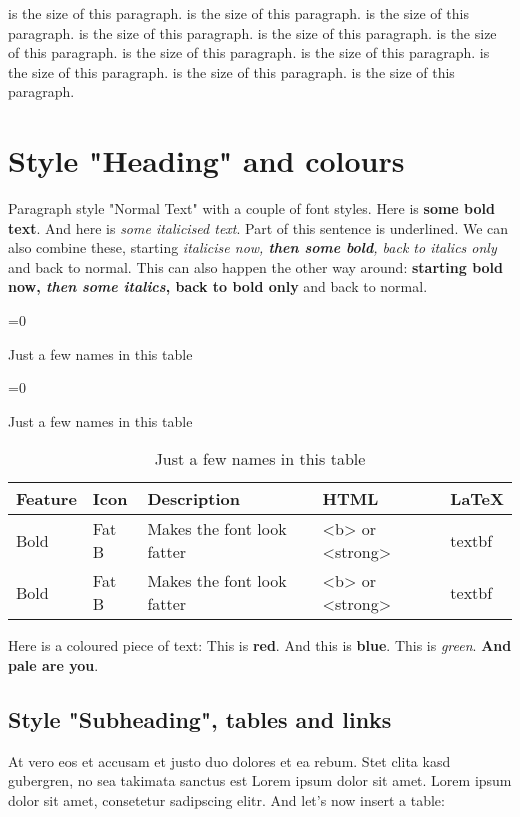 {\FontSizeTenPT 10pt is the size of this paragraph.}
{\FontSizeTwelvePT 12pt is the size of this paragraph.}
{\FontSizeFourteenPT 14pt is the size of this paragraph.}
{\FontSizeSixteenPT 16pt is the size of this paragraph.}
{\FontSizeEighteenPT 18pt is the size of this paragraph.}
{\FontSizeTwentyPT 20pt is the size of this paragraph.}
{\FontSizeTwentytwoPT 22pt is the size of this paragraph.}
{\FontSizeTwentyfourPT 24pt is the size of this paragraph.}
{\FontSizeTwentysixPT 26pt is the size of this paragraph.}
{\FontSizeTwentyeightPT 28pt is the size of this paragraph.}
{\FontSizeThirtyPT 30pt is the size of this paragraph.}

\chapter{Style "Heading" and colours}

Paragraph style "Normal Text" with a couple of font
styles. Here is 
\textbf{some bold text}. And here is 
\textit{some italicised text}. 
Part of this sentence is underlined. 
We can also combine these, starting 
\textit{italicise now, \textbf{then some bold}, back to italics only} and back to normal. This can
also happen the other way around: 
\textbf{starting bold now, \textit{then some italics}, back to bold only} and
back to normal.

\noindent
\begin{table}
	\ifnum{}=0 
		\caption*{Just a few names in this table}
	\else
		\ifnum{}=0 
			\caption*{Just a few names in this table}
		\else
			\caption{Just a few names in this table} 
		\fi
	\fi
	\begin{center}
		\begin{tabular}{lllll}
			\toprule
			Feature & Icon & Description & HTML & LaTeX \\
			\midrule
			Bold & Fat B & Makes the font look fatter & <b> or <strong> & textbf \\
			Bold & Fat B & Makes the font look fatter & <b> or <strong> & textbf \\
			\bottomrule
		\end{tabular}
	\end{center}
\end{table}

Here is a coloured piece of text: 
\textcolor[rgb]{1,0,0}{This is \textbf{red}.}
\textcolor[rgb]{0,0,1}{And this is \textbf{blue}.}
\textcolor[rgb]{0,1,0}{This is \textit{green}.}
\textcolor[rgb]{0.5,0.5,0.5}{\textbf{And pale are you}.}

\section{Style "Subheading", tables and links}
At vero eos et accusam et justo duo dolores et ea rebum. Stet
clita kasd gubergren, no sea takimata sanctus est Lorem ipsum dolor
sit amet. Lorem ipsum dolor sit amet, consetetur sadipscing elitr.
And let's now insert a table:
